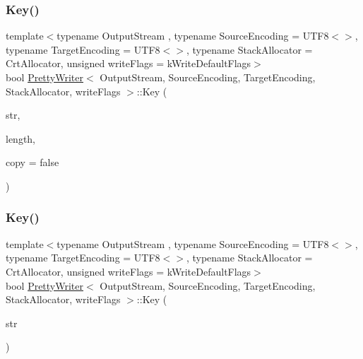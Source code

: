 \subsubsection{\texorpdfstring{Key()}{Key()}\hspace{0.1cm}{\footnotesize\ttfamily [1/2]}}
{\footnotesize\ttfamily template$<$typename Output\+Stream , typename Source\+Encoding  = U\+T\+F8$<$$>$, typename Target\+Encoding  = U\+T\+F8$<$$>$, typename Stack\+Allocator  = Crt\+Allocator, unsigned write\+Flags = k\+Write\+Default\+Flags$>$ \\
bool \hyperlink{classPrettyWriter}{Pretty\+Writer}$<$ Output\+Stream, Source\+Encoding, Target\+Encoding, Stack\+Allocator, write\+Flags $>$\+::Key (\begin{DoxyParamCaption}\item[{const \hyperlink{classPrettyWriter_ae35c89bda4c5d59d3ff6efcf2fea45a3}{Ch} $\ast$}]{str,  }\item[{\hyperlink{rapidjson_8h_a5ed6e6e67250fadbd041127e6386dcb5}{Size\+Type}}]{length,  }\item[{bool}]{copy = {\ttfamily false} }\end{DoxyParamCaption})\hspace{0.3cm}{\ttfamily [inline]}}

\mbox{\label{classPrettyWriter_a4b2a2a6eef02c12d7a3fd77966bd4499}} 
\subsubsection{\texorpdfstring{Key()}{Key()}\hspace{0.1cm}{\footnotesize\ttfamily [2/2]}}
{\footnotesize\ttfamily template$<$typename Output\+Stream , typename Source\+Encoding  = U\+T\+F8$<$$>$, typename Target\+Encoding  = U\+T\+F8$<$$>$, typename Stack\+Allocator  = Crt\+Allocator, unsigned write\+Flags = k\+Write\+Default\+Flags$>$ \\
bool \hyperlink{classPrettyWriter}{Pretty\+Writer}$<$ Output\+Stream, Source\+Encoding, Target\+Encoding, Stack\+Allocator, write\+Flags $>$\+::Key (\begin{DoxyParamCaption}\item[{const \hyperlink{classPrettyWriter_ae35c89bda4c5d59d3ff6efcf2fea45a3}{Ch} $\ast$}]{str }\end{DoxyParamCaption})\hspace{0.3cm}{\ttfamily [inline]}}

